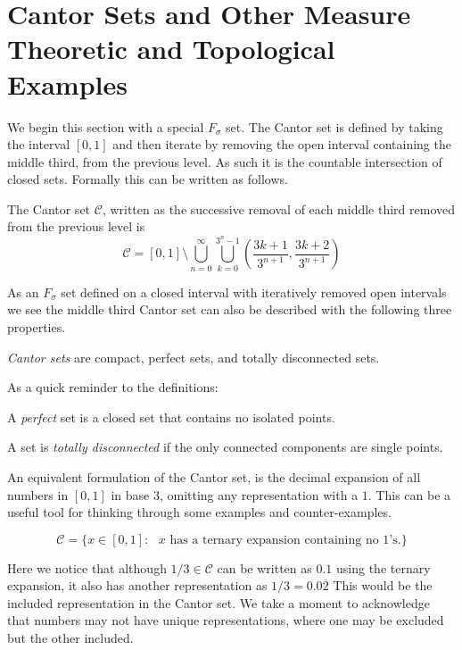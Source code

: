 \section{Cantor Sets and Other Measure Theoretic and Topological Examples}
We begin this section with a special $F_\sigma$ set.  The Cantor set is defined by taking the interval $[0,1]$ and then iterate by removing the open interval containing the middle third, from the previous level.  As such it is the countable intersection of closed sets.  Formally this can be written as follows.
\begin{definition}
    The Cantor set $\mathcal{C}$, written as the successive removal of each middle third removed from the previous level is 
    $$\mathcal{C} = [0,1] \setminus \bigcup_{n=0}^\infty\bigcup_{k=0}^{3^n-1}\left(\frac{3k+1}{3^{n+1}},\frac{3k+2}{3^{n+1}}\right)$$
\end{definition}

As an $F_\sigma$ set defined on a closed interval with iteratively removed open intervals we see the middle third Cantor set can also be described with the following three properties.
\begin{definition}
    \textit{Cantor sets} are compact, perfect sets, and totally disconnected sets.      
\end{definition}

As a quick reminder to the definitions:
\begin{definition}[Perfect]
    A \textit{perfect} set is a closed set that contains no isolated points.
\end{definition}
\begin{definition}
    A set is \textit{totally disconnected} if the only connected components are single points. 
\end{definition}


An equivalent formulation of the Cantor set, is the decimal expansion of all numbers in $[0,1]$ in base $3$, omitting any representation with a $1$. This can be a useful tool for thinking through some examples and counter-examples.
\begin{example}
    $$\mathcal{C}  = \{ x \in [0,1]: \text{ $x$ has a ternary expansion containing no $1$'s.}\}$$
\end{example}
Here we notice that although $1/3 \in \mathcal{C} $ can be written as $0.1$ using the ternary expansion, it also has another representation as $1/3 = 0.0\overline{2}$  This would be the included representation in the Cantor set.  We take a moment to acknowledge that numbers may not have unique representations, where one may be excluded but the other included.  


